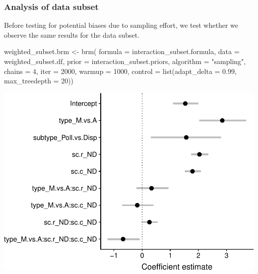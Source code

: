 \documentclass[11pt,]{article}
\newenvironment{Shaded}{}{}
\newcommand{\KeywordTok}[1]{\textcolor[rgb]{0.00,0.00,1.00}{#1}}
\newcommand{\DataTypeTok}[1]{#1}
\newcommand{\DecValTok}[1]{#1}
\newcommand{\FloatTok}[1]{#1}
\newcommand{\StringTok}[1]{\textcolor[rgb]{0.00,0.50,0.50}{#1}}
\newcommand{\NormalTok}[1]{#1}
\let\origfigure\figure
\let\endorigfigure\endfigure
\renewenvironment{figure}[1][2] {
    \expandafter\origfigure\expandafter[H]
} {
    \endorigfigure
}
\begin{document}
\subsubsection{Analysis of data subset}\label{analysis-of-data-subset}

Before testing for potential biases due to sampling effort, we test
whether we observe the same results for the data subset.

\begin{Shaded}
\begin{Highlighting}[]
\NormalTok{weighted_subset.brm <-}\StringTok{ }\KeywordTok{brm}\NormalTok{(}
  \DataTypeTok{formula =}\NormalTok{ interaction_subset.formula, }\DataTypeTok{data =}\NormalTok{ weighted_subset.df, }
  \DataTypeTok{prior =}\NormalTok{ interaction_subset.priors, }\DataTypeTok{algorithm =} \StringTok{"sampling"}\NormalTok{, }
  \DataTypeTok{chains =} \DecValTok{4}\NormalTok{, }\DataTypeTok{iter =} \DecValTok{2000}\NormalTok{, }\DataTypeTok{warmup =} \DecValTok{1000}\NormalTok{,}
  \DataTypeTok{control =} \KeywordTok{list}\NormalTok{(}\DataTypeTok{adapt_delta =} \FloatTok{0.99}\NormalTok{, }\DataTypeTok{max_treedepth =} \DecValTok{20}\NormalTok{))}
\end{Highlighting}
\end{Shaded}

\begin{figure}

{\centering \includegraphics[width=0.75\linewidth]{reproduce_analyses_files/figure-latex/weighted-table-plot-1} 

}

\caption{Mean and 95\% credible intervals of fixed effects from our weighted subset model.}\label{fig:weighted-table-plot}
\end{figure}
\end{document}
